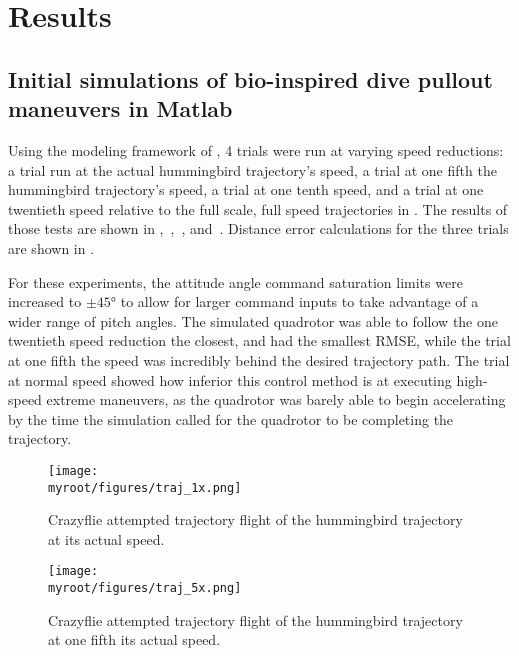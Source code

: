\documentclass[onecolumn,10pt]{IEEEtran}
\newcommand{\myroot}{../}
\newcommand{\Matlab}{Matlab}
\begin{document}
\section{Results}
\subsection{Initial simulations of bio-inspired dive pullout maneuvers in \Matlab}
Using the modeling framework of \cite{hartman2014quadcopter}, 4 trials were run at varying speed reductions: a trial run at the actual hummingbird trajectory's speed, a trial at one fifth the hummingbird trajectory's speed, a trial at one tenth speed, and a trial at one twentieth speed relative to the full scale, full speed trajectories in \cite{clark2009courtship}. The results of those tests are shown in ,~,~, and~. Distance error calculations for the three trials are shown in . 

For these experiments, the attitude angle command saturation limits were increased to $\pm\ang{45}$ to allow for larger command inputs to take advantage of a wider range of pitch angles. The simulated quadrotor was able to follow the one twentieth speed reduction the closest, and had the smallest RMSE, while the trial at one fifth the speed was incredibly behind the desired trajectory path. The trial at normal speed showed how inferior this control method is at executing high-speed extreme maneuvers, as the quadrotor was barely able to begin accelerating by the time the simulation called for the quadrotor to be completing the trajectory.

\begin{figure}[p]
\begin{center}
\texttt{[image: \\myroot/figures/traj\_1x.png]}
\end{center}
\caption{Crazyflie attempted trajectory flight of the hummingbird trajectory at its actual speed.}
\label{fig:actualspeed}
\end{figure}

\begin{figure}[p]
\begin{center}
\texttt{[image: \\myroot/figures/traj\_5x.png]}
\end{center}
\caption{Crazyflie attempted trajectory flight of the hummingbird trajectory at one fifth its actual speed.}
\label{fig:onefifthspeed}
\end{figure}
\end{document}
